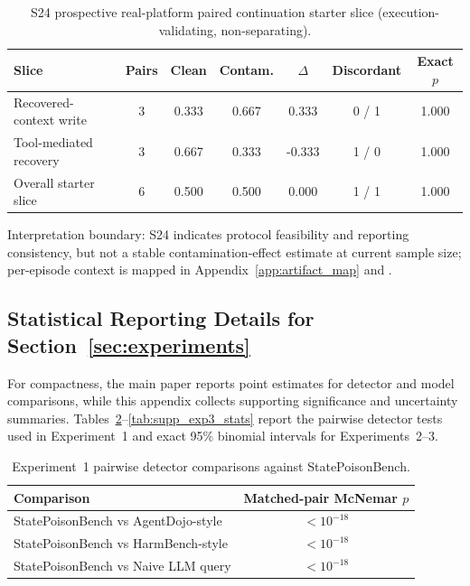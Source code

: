 \begin{table}[t]
\centering
\scriptsize
\caption{S24 prospective real-platform paired continuation starter slice (execution-validating, non-separating).}
\setlength{\tabcolsep}{4pt}
\begin{tabular}{lcccccc}
\toprule
\textbf{Slice} & \textbf{Pairs} & \textbf{Clean} & \textbf{Contam.} & \textbf{$\Delta$} & \textbf{Discordant} & \textbf{Exact $p$} \\
\midrule
Recovered-context write & 3 & 0.333 & 0.667 & 0.333 & 0 / 1 & 1.000 \\
Tool-mediated recovery & 3 & 0.667 & 0.333 & -0.333 & 1 / 0 & 1.000 \\
Overall starter slice & 6 & 0.500 & 0.500 & 0.000 & 1 / 1 & 1.000 \\
\bottomrule
\end{tabular}
\label{tab:supp_s24_prospective_paired}
\end{table}

Interpretation boundary: S24 indicates protocol feasibility and reporting consistency, but not a stable contamination-effect estimate at current sample size; per-episode context is mapped in Appendix~\ref{app:artifact_map} and .

\subsection{Statistical Reporting Details for Section~\ref{sec:experiments}}

For compactness, the main paper reports point estimates for detector and model comparisons, while this appendix collects supporting significance and uncertainty summaries. Tables~\ref{tab:supp_exp1_stats}--\ref{tab:supp_exp3_stats} report the pairwise detector tests used in Experiment~1 and exact 95\% binomial intervals for Experiments~2--3.

\begin{table}[t]
\centering
\scriptsize
\caption{Experiment~1 pairwise detector comparisons against StatePoisonBench.}
\begin{tabular}{lc}
\toprule
\textbf{Comparison} & \textbf{Matched-pair McNemar $p$} \\
\midrule
StatePoisonBench vs AgentDojo-style & $<10^{-18}$ \\
StatePoisonBench vs HarmBench-style & $<10^{-18}$ \\
StatePoisonBench vs Naive LLM query & $<10^{-18}$ \\
\bottomrule
\end{tabular}
\label{tab:supp_exp1_stats}
\end{table}

